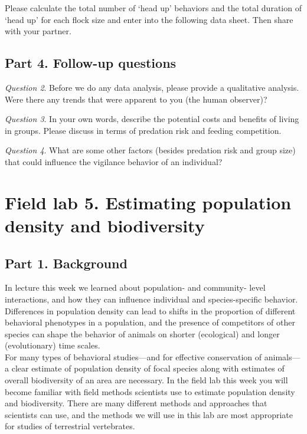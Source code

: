\documentclass[]{book}
\begin{document}
Please calculate the total number of `head up' behaviors and the total duration of `head up' for each flock size and enter into the following data sheet. Then share with your partner.

\hypertarget{part-4.-follow-up-questions}{%
\section*{Part 4. Follow-up questions}\label{part-4.-follow-up-questions}}

\emph{Question 2}. Before we do any data analysis, please provide a qualitative analysis. Were there any trends that were apparent to you (the human observer)?

\emph{Question 3}. In your own words, describe the potential costs and benefits of living in groups. Please discuss in terms of predation risk and feeding competition.

\emph{Question 4}. What are some other factors (besides predation risk and group size) that could influence the vigilance behavior of an individual?

\hypertarget{field-lab-5.-estimating-population-density-and-biodiversity}{%
\chapter*{Field lab 5. Estimating population density and biodiversity}\label{field-lab-5.-estimating-population-density-and-biodiversity}}

\hypertarget{part-1.-background}{%
\section*{Part 1. Background}\label{part-1.-background}}

In lecture this week we learned about population- and community- level interactions, and how they can influence individual and species-specific behavior. Differences in population density can lead to shifts in the proportion of different behavioral phenotypes in a population, and the presence of competitors of other species can shape the behavior of animals on shorter (ecological) and longer (evolutionary) time scales.\\
For many types of behavioral studies---and for effective conservation of animals--- a clear estimate of population density of focal species along with estimates of overall biodiversity of an area are necessary. In the field lab this week you will become familiar with field methods scientists use to estimate population density and biodiversity. There are many different methods and approaches that scientists can use, and the methods we will use in this lab are most appropriate for studies of terrestrial vertebrates.
\end{document}
